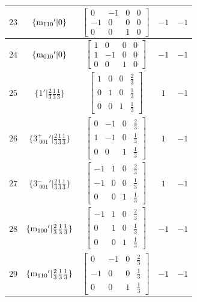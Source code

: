 \documentclass[fleqn,8pt]{jsarticle}
\begin{document}
\begin{longtable}{ccccc}
$ 23 $ & $ \{{\rm m}_{110}{}'|0\} $ & $ \begin{bmatrix} 0 & -1 & 0 & 0 \\ -1 & 0 & 0 & 0 \\ 0 & 0 & 1 & 0 \end{bmatrix} $ & $ -1 $ & $ -1 $ \\ \hline
$ 24 $ & $ \{{\rm m}_{010}{}'|0\} $ & $ \begin{bmatrix} 1 & 0 & 0 & 0 \\ 1 & -1 & 0 & 0 \\ 0 & 0 & 1 & 0 \end{bmatrix} $ & $ -1 $ & $ -1 $ \\ \hline
$ 25 $ & $ \{1{}'|\frac{2}{3} \frac{1}{3} \frac{1}{3}\} $ & $ \begin{bmatrix} 1 & 0 & 0 & \frac{2}{3} \\ 0 & 1 & 0 & \frac{1}{3} \\ 0 & 0 & 1 & \frac{1}{3} \end{bmatrix} $ & $ 1 $ & $ -1 $ \\ \hline
$ 26 $ & $ \{3^{+}_{\,\,001}{}'|\frac{2}{3} \frac{1}{3} \frac{1}{3}\} $ & $ \begin{bmatrix} 0 & -1 & 0 & \frac{2}{3} \\ 1 & -1 & 0 & \frac{1}{3} \\ 0 & 0 & 1 & \frac{1}{3} \end{bmatrix} $ & $ 1 $ & $ -1 $ \\ \hline
$ 27 $ & $ \{3^{-}_{\,\,001}{}'|\frac{2}{3} \frac{1}{3} \frac{1}{3}\} $ & $ \begin{bmatrix} -1 & 1 & 0 & \frac{2}{3} \\ -1 & 0 & 0 & \frac{1}{3} \\ 0 & 0 & 1 & \frac{1}{3} \end{bmatrix} $ & $ 1 $ & $ -1 $ \\ \hline
$ 28 $ & $ \{{\rm m}_{100}{}'|\frac{2}{3} \frac{1}{3} \frac{1}{3}\} $ & $ \begin{bmatrix} -1 & 1 & 0 & \frac{2}{3} \\ 0 & 1 & 0 & \frac{1}{3} \\ 0 & 0 & 1 & \frac{1}{3} \end{bmatrix} $ & $ -1 $ & $ -1 $ \\ \hline
$ 29 $ & $ \{{\rm m}_{110}{}'|\frac{2}{3} \frac{1}{3} \frac{1}{3}\} $ & $ \begin{bmatrix} 0 & -1 & 0 & \frac{2}{3} \\ -1 & 0 & 0 & \frac{1}{3} \\ 0 & 0 & 1 & \frac{1}{3} \end{bmatrix} $ & $ -1 $ & $ -1 $ \\ \hline

\end{longtable}
\end{document}
